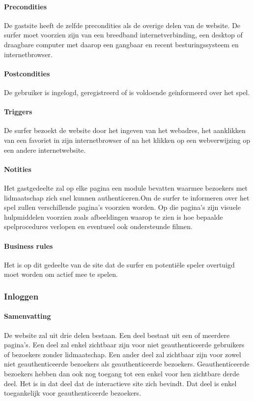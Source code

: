 \paragraph{Precondities} De gastsite heeft de zelfde precondities als de overige delen van de website. De surfer moet voorzien zijn van een breedband internetverbinding, een desktop of draagbare computer met daarop een gangbaar en recent besturingssysteem en internetbrowser.
\paragraph{Postcondities} De gebruiker is ingelogd, geregistreerd of is voldoende geïnformeerd over het spel.
\paragraph{Triggers} De surfer bezoekt de website door het ingeven van het webadres, het aanklikken van een favoriet in zijn internetbrowser of na het klikken op een webverwijzing op een andere internetwebsite.
\paragraph{Notities} Het gastgedeelte zal op elke pagina een module bevatten waarmee bezoekers met lidmaatschap zich snel kunnen authenticeren.\small{Om de surfer te informeren over het spel zullen verschillende pagina's voorzien worden. Op die pagina's zijn visuele hulpmiddelen voorzien zoals afbeeldingen waarop te zien is hoe bepaalde spelprocedures verlopen en eventueel ook ondersteunde filmen.}
\paragraph{Business rules}Het is op dit gedeelte van de site dat de surfer en potentiële speler overtuigd moet worden om actief mee te spelen.


\subsubsection{Inloggen}
\paragraph{Samenvatting} De website zal uit drie delen bestaan. Een deel bestaat uit een of meerdere pagina's. Een deel zal enkel zichtbaar zijn voor niet geauthenticeerde gebruikers of bezoekers zonder lidmaatschap. Een ander deel zal zichtbaar zijn voor zowel niet geauthenticeerde bezoekers als geauthenticeerde bezoekers. Geauthenticeerde bezoekers hebben dan ook nog toegang tot een enkel voor hen zichtbare derde deel. Het is in dat deel dat de interactieve site zich bevindt. Dat deel is enkel toegankelijk voor geauthenticeerde bezoekers.

